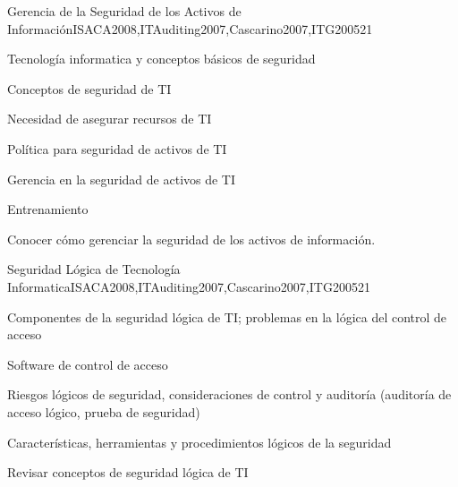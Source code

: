 \begin{syllabus}
    \begin{unit}{Gerencia de la Seguridad de los Activos de Información}{}{ISACA2008,ITAuditing2007,Cascarino2007,ITG2005}{2}{1}
    \begin{topics}
    \item Tecnología informatica y conceptos básicos de seguridad
    \item Conceptos de seguridad de TI 
    \item Necesidad de asegurar recursos de TI
    \item Política para seguridad de activos de TI 
    \item Gerencia en la seguridad de activos de TI 
    \item Entrenamiento
    \end{topics}
    
    \begin{learningoutcomes}
    \item Conocer cómo gerenciar la seguridad de los activos de información.
    \end{learningoutcomes}
    \end{unit}
    
    \begin{unit}{Seguridad Lógica de Tecnología Informatica}{}{ISACA2008,ITAuditing2007,Cascarino2007,ITG2005}{2}{1}
    \begin{topics}
    \item Componentes de la seguridad lógica de TI; problemas en la lógica del control de acceso
    \item Software de control de acceso
    \item Riesgos lógicos de seguridad, consideraciones de control y auditoría (auditoría de acceso lógico, prueba de seguridad)
    \item Características, herramientas y procedimientos lógicos de la seguridad
    \end{topics}
    
    \begin{learningoutcomes}
    \item Revisar conceptos de seguridad lógica de TI
    \end{learningoutcomes}
    \end{unit}
    

\end{syllabus}
